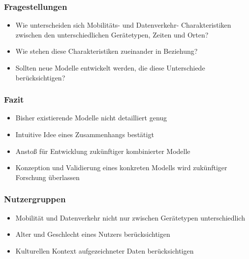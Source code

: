 \documentclass{beamer}
\begin{document}
\begin{frame}
  \frametitle{Fragestellungen}
  \begin{itemize}
    \item Wie unterscheiden sich Mobilitäts- und Datenverkehr- Charakteristiken zwischen den unterschiedlichen Gerätetypen,
    Zeiten und Orten?\newline
    \item Wie stehen diese Charakteristiken zueinander in Beziehung?\newline
    \item Sollten neue Modelle entwickelt werden, die diese Unterschiede berücksichtigen?
\end{itemize}
\end{frame}

\begin{frame}
  \frametitle{Fazit}

  \begin{itemize}
    \item Bisher existierende Modelle nicht detailliert genug
    \item Intuitive Idee eines Zusammenhangs bestätigt
    \item Anstoß für Entwicklung zukünftiger kombinierter Modelle
    \item Konzeption und Validierung eines konkreten Modells wird zukünftiger Forschung überlassen
    
  \end{itemize}
\end{frame}

\begin{frame}
  \frametitle{Nutzergruppen}

  \begin{itemize}
    \item Mobilität und Datenverkehr nicht nur zwischen Gerätetypen unterschiedlich
    \item Alter und Geschlecht eines Nutzers berücksichtigen
    \item Kulturellen Kontext aufgezeichneter Daten berücksichtigen
    
  \end{itemize}
  
\end{frame}
\end{document}
